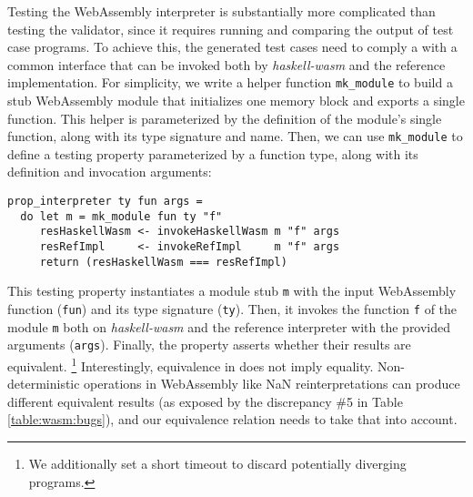\documentclass[sigconf,review,anonymous]{acmart}
\begin{document}
Testing the WebAssembly interpreter is substantially more complicated than
testing the validator, since it requires running and comparing the output of
test case programs.
%
To achieve this, the generated test cases need to comply a with a common
interface that can be invoked both by \textit{haskell-wasm} and the reference
implementation.
%
For simplicity, we write a helper function \texttt{mk\_module} to build a
stub WebAssembly module that initializes one memory block and exports a single
function.
%
This helper is parameterized by the definition of the module's single function,
along with its type signature and name.
%
%
%
Then, we can use \texttt{mk\_module} to define a testing property parameterized
by a function type, along with its definition and invocation arguments:



\begin{verbatim}
prop_interpreter ty fun args =
  do let m = mk_module fun ty "f"
     resHaskellWasm <- invokeHaskellWasm m "f" args
     resRefImpl     <- invokeRefImpl     m "f" args
     return (resHaskellWasm === resRefImpl)
\end{verbatim}

This testing property instantiates a module stub \texttt{m} with the input
WebAssembly function (\texttt{fun}) and its type signature (\texttt{ty}).
%
Then, it invokes the function \texttt{f} of the module \texttt{m} both on
\textit{haskell-wasm} and the reference interpreter with the provided arguments
(\texttt{args}).
%
Finally, the property asserts whether their results are equivalent.%
%
\footnote{We additionally set a short timeout to discard potentially diverging
  programs.}
%
Interestingly, equivalence in does not imply equality.
%
Non-deterministic operations in WebAssembly like NaN reinterpretations can
produce different equivalent results (as exposed by the discrepancy \#5 in Table
\ref{table:wasm:bugs}), and our equivalence relation needs to take that into
account.
%
\end{document}
